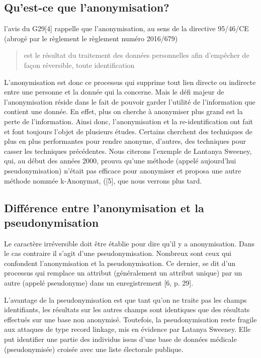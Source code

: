 \subsection{Qu'est-ce que l’anonymisation?} 

l’avis du G29[4] rappelle que l’anonymisation, au sens de la directive 95/46/CE (abrogé par le règlement le règlement numéro 2016/679)
\begin{quote}
    est le résultat du traitement des données personnelles afin d’empêcher de façon réversible, toute identification
\end{quote}  

L’anonymisation est donc ce processus qui supprime tout lien directe ou indirecte entre une personne et la donnée qui la concerne. Mais le défi majeur de l’anonymisation réside dans le fait de pouvoir garder l’utilité de l’information que contient une donnée.  En effet, plus on cherche à anonymiser plus grand est la perte de l’information.  
Ainsi donc, l’anonymisation et la re-identification ont fait et font toujours l’objet de plusieurs études. Certains cherchent des techniques de plus en plus performantes pour rendre anonyme, d’autres, des techniques pour casser les techniques précédentes. Nous citerons l'exemple de Lantanya Sweeney, qui, au début des années 2000, prouva qu’une méthode (appelé aujourd’hui pseudonymisation) n’était pas efficace pour anonymiser et   proposa une autre méthode nommée k-Anonymat, ([5], que nous verrons plus tard. 

\subsection{Différence entre l’anonymisation et la pseudonymisation}

Le caractère irréversible doit être établie pour dire qu’il y a anonymisation. Dans le cas contraire il s’agit d’une pseudonymisation. Nombreux sont ceux qui confondent l’anonymisation et la pseudonymisation. Ce dernier, se dit d’un processus qui remplace un attribut (généralement un attribut unique) par un autre (appelé pseudonyme) dans un enregistrement [6, p. 29]. 

L’avantage de la pseudonymisation est que tant qu’on ne traite pas les champs identifiants, les résultats sur les autres champs sont identiques que des résultats effectués sur une base non anonymisé. Toutefois, la pseudonymisation reste fragile aux attaques de type record linkage, mis en évidence par Latanya Sweeney. Elle put identifier une partie des individus issus d’une base de données médicale (pseudonymisée) croisée avec une liste électorale publique. 

